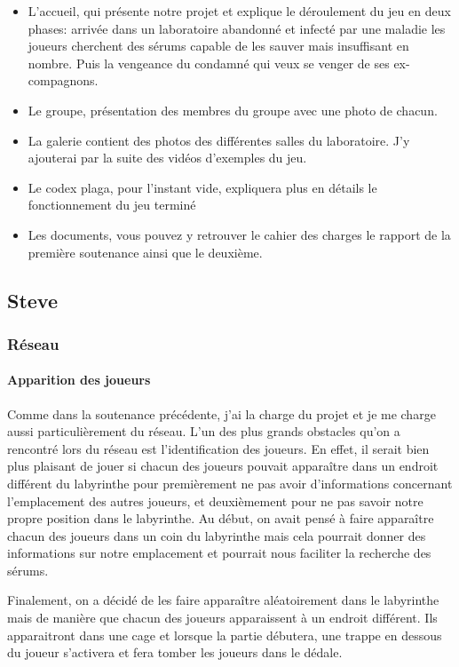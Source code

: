 \documentclass{article}
\begin{document}
\begin{itemize}
    \item L'accueil, qui présente notre projet et explique le déroulement du jeu en deux phases: arrivée dans un laboratoire abandonné et infecté par une maladie les joueurs cherchent des sérums capable de les sauver mais insuffisant en nombre. Puis la vengeance du condamné qui veux se venger de ses ex-compagnons.
    \item Le groupe, présentation des membres du groupe avec une photo de chacun.
    \item La galerie contient des photos des différentes salles du laboratoire. J'y ajouterai par la suite des vidéos d'exemples du jeu.
    \item Le codex plaga, pour l'instant vide, expliquera plus en détails le fonctionnement du jeu terminé
    \item Les documents, vous pouvez y retrouver le cahier des charges le rapport de la première soutenance ainsi que le deuxième.
\end{itemize}{}

\newpage
\subsection{Steve}

\subsubsection{Réseau}
\paragraph{Apparition des joueurs}

Comme dans la soutenance précédente, j’ai la charge du projet et je me charge aussi particulièrement du réseau. L'un des plus grands obstacles qu'on a rencontré lors du réseau est l'identification des joueurs. En effet, il serait bien plus plaisant de jouer si chacun des joueurs pouvait apparaître dans un endroit différent du labyrinthe pour premièrement ne pas avoir d'informations concernant l'emplacement des autres joueurs, et deuxièmement pour ne pas savoir notre propre position dans le labyrinthe. Au début, on avait pensé à faire apparaître chacun des joueurs dans un coin du labyrinthe mais cela pourrait donner des informations sur notre emplacement et pourrait nous faciliter la recherche des sérums.

Finalement, on a décidé de les faire apparaître aléatoirement dans le labyrinthe mais de manière que chacun des joueurs apparaissent à un endroit différent. Ils apparaitront dans une cage et lorsque la partie débutera, une trappe en dessous du joueur s'activera et fera tomber les joueurs dans le dédale.
\end{document}
